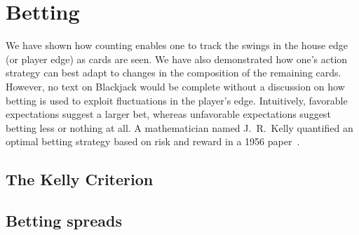 
\chapter{Betting}
\label{sec:betting}

We have shown how counting enables one to track the swings in
the house edge (or player edge) as cards are seen.
We have also demonstrated how one's action strategy 
can best adapt to changes in the composition of the remaining cards.  
However, no text on Blackjack would be complete without a discussion
on how betting is used to exploit fluctuations in the player's edge.
Intuitively, favorable expectations suggest a larger bet, whereas 
unfavorable expectations suggest betting less or nothing at all.  
A mathematician named J.~R.~Kelly quantified an optimal betting 
strategy based on risk and reward in a 1956 paper~\cite{ref:kelly56}.

\section{The Kelly Criterion}
\label{sec:betting:kelly}

\section{Betting spreads}
\label{sec:betting:spreads}

